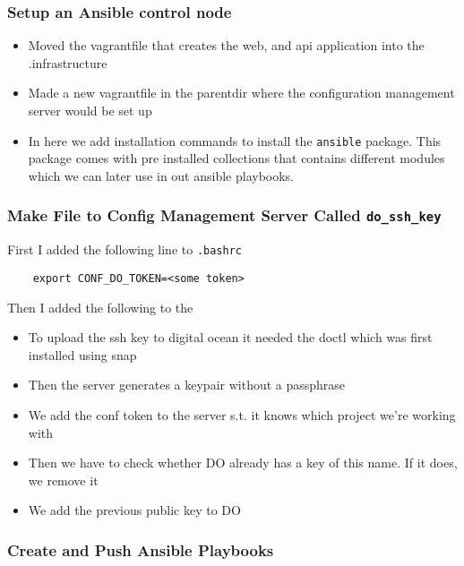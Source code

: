 \subsubsection{Setup an Ansible control node}
\label{log:setup-an-ansible-control-node}

\begin{itemize}
    \item Moved the vagrantfile that creates the web, and api application into the .infrastructure
    \item Made a new vagrantfile in the parentdir where the configuration management server would be set up
    \item In here we add installation commands to install the \texttt{ansible} package. This package comes with pre installed collections that contains different modules which we can later use in out ansible playbooks.
\end{itemize}

\hypertarget{make-file-to-config-management-server-called-do_ssh_key}{%
\subsubsection{Make File to Config Management Server Called
\texttt{do\_ssh\_key}}\label{make-file-to-config-management-server-called-do_ssh_key}}

First I added the following line to \texttt{.bashrc}

\begin{verbatim}
    export CONF_DO_TOKEN=<some token>
\end{verbatim}

Then I added the following to the

\begin{itemize}
    \item To upload the ssh key to digital ocean it needed the doctl which was first installed using snap
    \item Then the server generates a keypair without a passphrase
    \item We add the conf token to the server s.t. it knows which project we're working with
    \item Then we have to check whether DO already has a key of this name. If it does, we remove it
    \item We add the previous public key to DO
\end{itemize}

\subsubsection{Create and Push Ansible Playbooks}
\label{log:create-and-push-ansible-playbooks}

